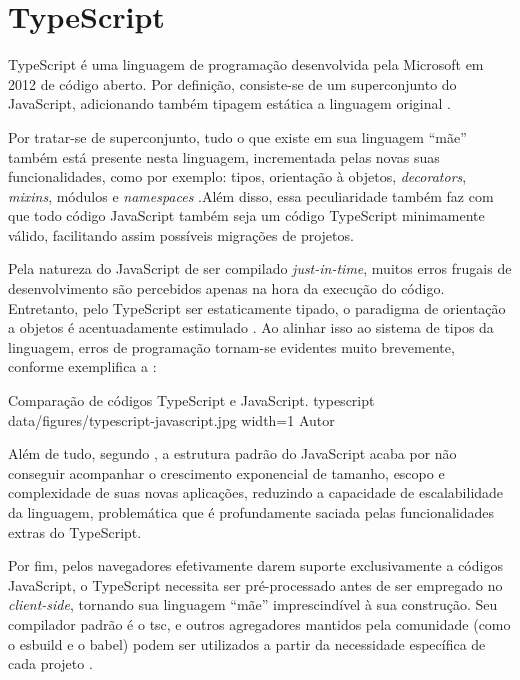 \section{TypeScript}
\label{sec:typescript}
TypeScript é uma linguagem de programação desenvolvida pela Microsoft em 2012 de código aberto. Por definição, consiste-se de um superconjunto do JavaScript, adicionando também tipagem estática a linguagem original \cite{Microsoft2023}.

Por tratar-se de superconjunto, tudo o que existe em sua linguagem “mãe” também está presente nesta linguagem, incrementada pelas novas suas funcionalidades, como por exemplo: tipos, orientação à objetos, \textit{decorators}, \textit{mixins}, módulos e \textit{namespaces} \cite{Goldberg2022}.Além disso, essa peculiaridade também faz com que todo código JavaScript também seja um código TypeScript minimamente válido, facilitando assim possíveis migrações de projetos.

Pela natureza do JavaScript de ser compilado \textit{just-in-time}, muitos erros frugais de desenvolvimento são percebidos apenas na hora da execução do código. Entretanto, pelo TypeScript ser estaticamente tipado, o paradigma de orientação a objetos é acentuadamente estimulado \cite{Goldberg2022}. Ao alinhar isso ao sistema de tipos da linguagem, erros de programação tornam-se evidentes muito brevemente, conforme exemplifica a :

\image
    {Comparação de códigos TypeScript e JavaScript.}
    {typescript}
    {data/figures/typescript-javascript.jpg}
    {width=1\textwidth}
    {Autor}

Além de tudo, segundo , a estrutura padrão do JavaScript acaba por não conseguir acompanhar o crescimento exponencial de tamanho, escopo e complexidade de suas novas aplicações, reduzindo a capacidade de escalabilidade da linguagem, problemática que é profundamente saciada pelas funcionalidades extras do TypeScript.

Por fim, pelos navegadores efetivamente darem suporte exclusivamente a códigos JavaScript, o TypeScript necessita ser pré-processado antes de ser empregado no \textit{client-side}, tornando sua linguagem “mãe” imprescindível à sua construção. Seu compilador padrão é o tsc, e outros agregadores mantidos pela comunidade (como o esbuild e o babel) podem ser utilizados a partir da necessidade específica de cada projeto \cite{Microsoft2023a}.

